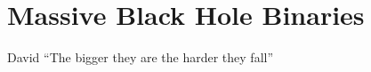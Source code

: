 \part[Massive Black Hole Binaries]{Massive Black Hole Binaries} \label{partI}


\vspace{-16pt} \begin{chapquote}{David} \singlespacing ``The bigger they are the harder they fall'' 
 \end{chapquote} \vspace{-8pt}
\noindent\makebox[\linewidth]{\rule{0.5\textwidth}{0.5pt}} \vspace{1pt}






















